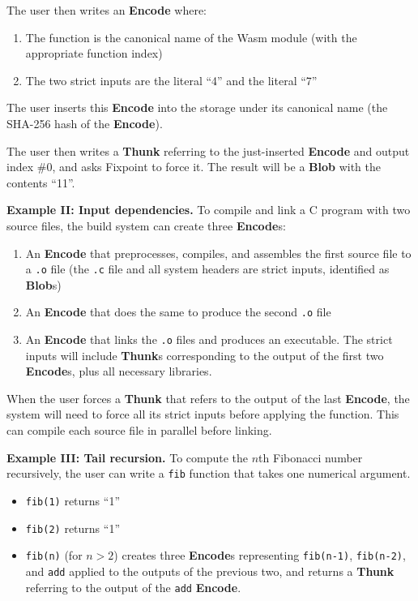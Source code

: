 \documentclass{article}
\newcommand{\blob}{\textbf{Blob}\xspace}
\newcommand{\blobs}{\textbf{Blob}s\xspace}
\newcommand{\encode}{\textbf{Encode}\xspace}
\newcommand{\thunk}{\textbf{Thunk}\xspace}
\newcommand{\thunks}{\textbf{Thunk}s\xspace}
\newcommand{\encodes}{\textbf{Encode}s\xspace}
\begin{document}
The user then writes an \encode where:
\begin{enumerate}[topsep=0pt]
\item The function is the canonical name of the Wasm module (with the appropriate function index)
\item The two strict inputs are the literal ``4'' and the literal ``7''
\end{enumerate}
The user inserts this \encode into the storage under its canonical
name (the SHA-256 hash of the \encode).

The user then writes a \thunk referring to the just-inserted \encode and output index \#0, and asks Fixpoint
to force it. The result will be a \blob with the contents ``11''.

\textbf{Example II: Input dependencies.} To compile and link a C program with two source files,
the build system can create three \encodes:
\begin{enumerate}[topsep=0pt]
\item An \encode that preprocesses, compiles, and assembles the first source file to a \texttt{.o} file
  (the \texttt{.c} file and all system headers are strict inputs, identified as \blobs)
\item An \encode that does the same to produce the second \texttt{.o} file
\item An \encode that links the \texttt{.o} files and produces an executable. The strict inputs will include \thunks corresponding to the output of the first two \encodes, plus all necessary libraries.
\end{enumerate}

When the user forces a \thunk that refers to the output of the last \encode, the system will need to force
all its strict inputs before applying the function. This can compile each source file in parallel before linking.

\textbf{Example III: Tail recursion.} To compute the $n$th Fibonacci number
recursively, the user can write a \texttt{fib} function that
takes one numerical argument.
\begin{itemize}[topsep=0pt]
\item \texttt{fib(1)} returns ``1''
\item \texttt{fib(2)} returns ``1''
  \item \texttt{fib(n)} (for $n>2$) creates three \encodes
    representing \texttt{fib(n-1)}, \texttt{fib(n-2)}, and
    \texttt{add} applied to the outputs of the previous two, and
    returns a \thunk referring to the output of the \texttt{add}
    \encode.
    \end{itemize}
\end{document}
